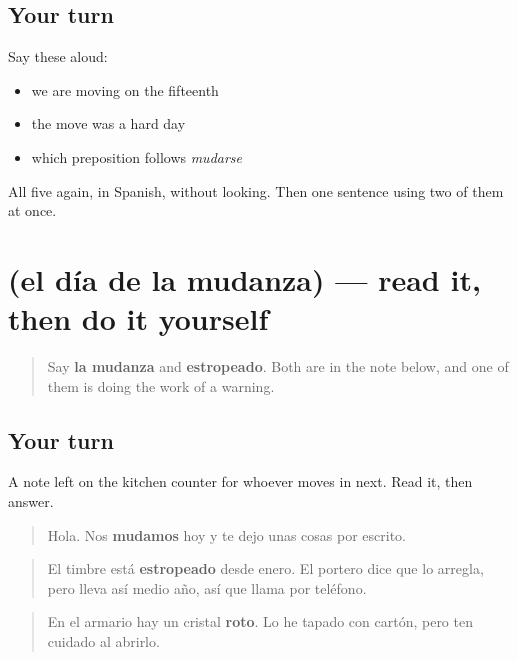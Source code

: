 \subsection*{Your turn}
Say these aloud:

\begin{itemize}
\raggedright
  \item we are moving on the fifteenth
  \item the move was a hard day
  \item which preposition follows \emph{mudarse}
\end{itemize}

\begin{tcolorbox}[breakable,colback=teal!4,colframe=teal!35!black,title={Before you move on}]
All five again, in Spanish, without looking. Then one sentence using two of them at once.
\end{tcolorbox}
\section[Practice]{(el día de la mudanza) — read it, then do it yourself}

\label{lesson:ES-C448-sintesis-mudanza}



\begin{quote}
Say \textbf{la mudanza} and \textbf{estropeado}. Both are in the note below, and one of them is doing the work of a warning.
\end{quote}

\subsection*{Your turn}
A note left on the kitchen counter for whoever moves in next. Read it, then answer.

\begin{quote}
Hola. Nos \textbf{mudamos} hoy y te dejo unas cosas por escrito.
\end{quote}

\begin{quote}
El timbre está \textbf{estropeado} desde enero. El portero dice que lo arregla, pero lleva así medio año, así que llama por teléfono.
\end{quote}

\begin{quote}
En el armario hay un cristal \textbf{roto}. Lo he tapado con cartón, pero ten cuidado al abrirlo.
\end{quote}

